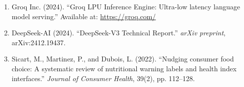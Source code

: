 \documentclass[12pt]{article}
\begin{document}
\begin{enumerate}
    \vspace{0.2cm}
    \item Groq Inc. (2024). ``Groq LPU Inference Engine: Ultra-low latency language model serving.'' Available at: \url{https://groq.com/}
    
    \vspace{0.2cm}
    \item DeepSeek-AI (2024). ``DeepSeek-V3 Technical Report.'' \textit{arXiv preprint}, arXiv:2412.19437.
    
    \vspace{0.2cm}
    \item Sicart, M., Martinez, P., and Dubois, L. (2022). ``Nudging consumer food choice: A systematic review of nutritional warning labels and health index interfaces.'' \textit{Journal of Consumer Health}, 39(2), pp. 112--128.
\end{enumerate}
\end{document}
